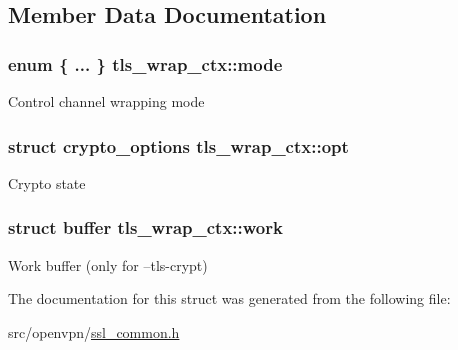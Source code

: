 \subsection{Member Data Documentation}
\hypertarget{structtls__wrap__ctx_a7d6bdbb4efeaa095e3ee138e490f684e}{}
\subsubsection[{mode}]{\setlength{\rightskip}{0pt plus 5cm}enum \{ ... \}   tls\+\_\+wrap\+\_\+ctx\+::mode}\label{structtls__wrap__ctx_a7d6bdbb4efeaa095e3ee138e490f684e}
Control channel wrapping mode \hypertarget{structtls__wrap__ctx_a610411b7046f8b43a47cc92c0ef9bd6d}{}
\subsubsection[{opt}]{\setlength{\rightskip}{0pt plus 5cm}struct {\bf crypto\+\_\+options} tls\+\_\+wrap\+\_\+ctx\+::opt}\label{structtls__wrap__ctx_a610411b7046f8b43a47cc92c0ef9bd6d}
Crypto state \hypertarget{structtls__wrap__ctx_aabfcb82396ee2810549bcc8fa1c43e91}{}
\subsubsection[{work}]{\setlength{\rightskip}{0pt plus 5cm}struct {\bf buffer} tls\+\_\+wrap\+\_\+ctx\+::work}\label{structtls__wrap__ctx_aabfcb82396ee2810549bcc8fa1c43e91}
Work buffer (only for --tls-\/crypt) 

The documentation for this struct was generated from the following file\+:\begin{DoxyCompactItemize}
\item 
src/openvpn/\hyperlink{ssl__common_8h}{ssl\+\_\+common.\+h}\end{DoxyCompactItemize}
